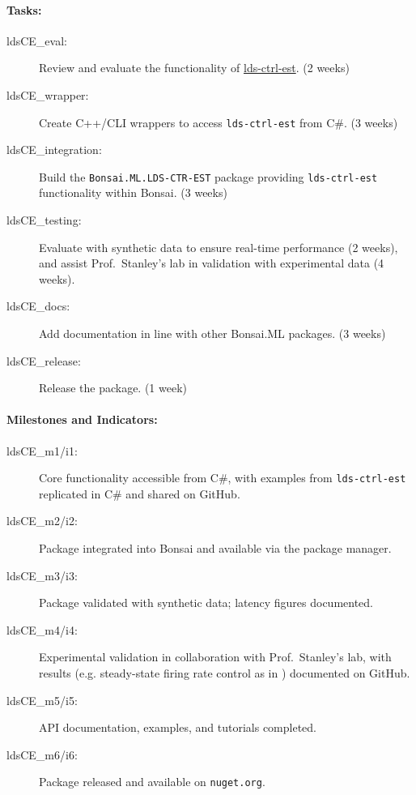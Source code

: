 \paragraph{Tasks:}  

\begin{description}
    \item[ldsCE\_eval:] Review and evaluate the functionality of \href{https://github.com/CLOCTools/lds-ctrl-est}{lds-ctrl-est}. (2 weeks)  
    \item[ldsCE\_wrapper:] Create C++/CLI wrappers to access \texttt{lds-ctrl-est} from C\#. (3 weeks)  
    \item[ldsCE\_integration:] Build the \texttt{Bonsai.ML.LDS-CTR-EST} package providing \texttt{lds-ctrl-est} functionality within Bonsai. (3 weeks)  
    \item[ldsCE\_testing:] Evaluate with synthetic data to ensure real-time performance (2 weeks), and assist Prof.~Stanley’s lab in validation with experimental data (4 weeks).  
    \item[ldsCE\_docs:] Add documentation in line with other Bonsai.ML packages. (3 weeks)  
    \item[ldsCE\_release:] Release the package. (1 week)  
\end{description}  

\paragraph{Milestones and Indicators:}  

\begin{description}
    \item[ldsCE\_m1/i1:] Core functionality accessible from C\#, with examples from \texttt{lds-ctrl-est} replicated in C\# and shared on GitHub.  
    \item[ldsCE\_m2/i2:] Package integrated into Bonsai and available via the package manager.  
    \item[ldsCE\_m3/i3:] Package validated with synthetic data; latency figures documented.  
    \item[ldsCE\_m4/i4:] Experimental validation in collaboration with Prof.~Stanley’s lab, with results (e.g. steady-state firing rate control as in \citet{bolusEtAl21}) documented on GitHub.  
    \item[ldsCE\_m5/i5:] API documentation, examples, and tutorials completed.  
    \item[ldsCE\_m6/i6:] Package released and available on \texttt{nuget.org}.  
\end{description}

